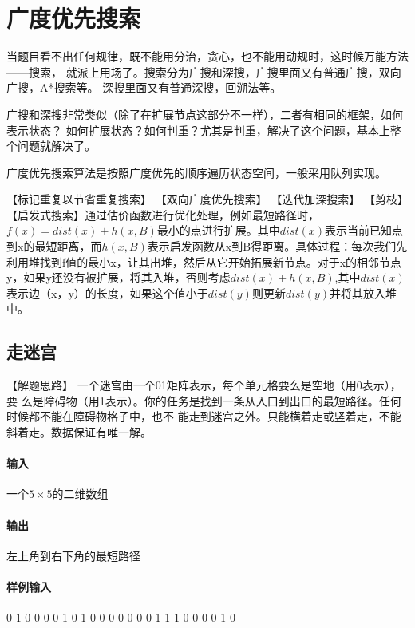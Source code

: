 \chapter{广度优先搜索}
当题目看不出任何规律，既不能用分治，贪心，也不能用动规时，这时候万能方法——搜索，
就派上用场了。搜索分为广搜和深搜，广搜里面又有普通广搜，双向广搜，A*搜索等。
深搜里面又有普通深搜，回溯法等。

广搜和深搜非常类似（除了在扩展节点这部分不一样），二者有相同的框架，如何表示状态？
如何扩展状态？如何判重？尤其是判重，解决了这个问题，基本上整个问题就解决了。

广度优先搜索算法是按照广度优先的顺序遍历状态空间，一般采用队列实现。

【标记重复以节省重复搜索】
【双向广度优先搜索】
【迭代加深搜索】
【剪枝】
【启发式搜索】通过估价函数进行优化处理，例如最短路径时，$f(x)=dist(x)+h(x,B)$最小的点进行扩展。其中$dist(x)$表示当前已知点到x的最短距离，而$h(x,B)$表示启发函数从x到B得距离。具体过程：每次我们先利用堆找到f值的最小x，让其出堆，然后从它开始拓展新节点。对于x的相邻节点y，如果y还没有被扩展，将其入堆，否则考虑$dist(x)+h(x,B)$,其中$dist(x)$表示边（x，y）的长度，如果这个值小于$dist(y)$则更新$dist(y)$并将其放入堆中。
\section{走迷宫} %

【解题思路】
一个迷宫由一个01矩阵表示，每个单元格要么是空地（用0表示），要
么是障碍物（用1表示）。你的任务是找到一条从入口到出口的最短路径。任何时候都不能在障碍物格子中，也不
能走到迷宫之外。只能横着走或竖着走，不能斜着走。数据保证有唯一解。

\subsubsection{输入}
一个$5 \times 5$的二维数组

\subsubsection{输出}
左上角到右下角的最短路径

\subsubsection{样例输入}
\begin{Code}
0 1 0 0 0
0 1 0 1 0
0 0 0 0 0
0 1 1 1 0
0 0 0 1 0
\end{Code}


